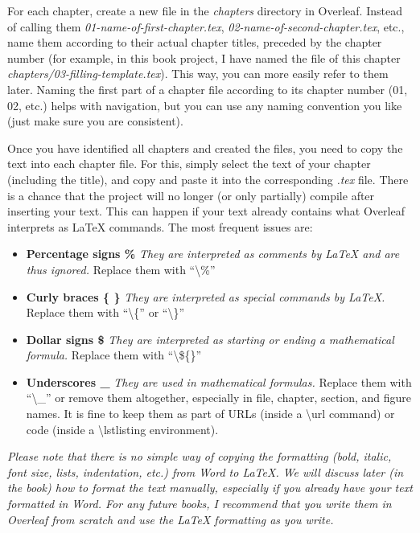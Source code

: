 For each chapter, create a new file in the \textit{chapters} directory in Overleaf. Instead of calling them \textit{01-name-of-first-chapter.tex}, \textit{02-name-of-second-chapter.tex}, etc., name them according to their actual chapter titles, preceded by the chapter number (for example, in this book project, I have named the file of this chapter \textit{chapters/03-filling-template.tex}). This way, you can more easily refer to them later. Naming the first part of a chapter file according to its chapter number (01, 02, etc.) helps with navigation, but you can use any naming convention you like (just make sure you are consistent).

Once you have identified all chapters and created the files, you need to copy the text into each chapter file. For this, simply select the text of your chapter (including the title), and copy and paste it into the corresponding \textit{.tex} file. There is a chance that the project will no longer (or only partially) compile after inserting your text. This can happen if your text already contains what Overleaf interprets as LaTeX commands. The most frequent issues are:

\begin{itemize}
\item \textbf{Percentage signs \%}\index{\%}  \textit{They are interpreted as comments by LaTeX and are thus ignored.} Replace them with ``\textbackslash\%''
\item \textbf{Curly braces \{ \}}\index{\{\}}  \textit{They are interpreted as special commands by LaTeX.} Replace them with ``\textbackslash\{'' or ``\textbackslash\}''
\item \textbf{Dollar signs \$}\index{\$}  \textit{They are interpreted as starting or ending a mathematical formula.} Replace them with ``\textbackslash\$\{\}''
\item \textbf{Underscores \_}\index{\_}  \textit{They are used in mathematical formulas.} Replace them with ``\textbackslash\_'' or remove them altogether, especially in file, chapter, section, and figure names. It is fine to keep them as part of URLs (inside a \textbackslash url command) or code (inside a \textbackslash lstlisting environment).
\end{itemize}

\textit{Please note that there is no simple way of copying the formatting (bold, italic, font size, lists, indentation, etc.) from Word to LaTeX. We will discuss later (in the book) how to format the text manually, especially if you already have your text formatted in Word. For any future books, I recommend that you write them in Overleaf from scratch and use the LaTeX formatting as you write.}

